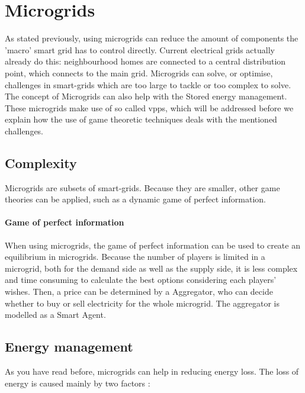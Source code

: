 \newpage
\section{Microgrids}\label{microgrids}



As stated previously, using microgrids can reduce the amount of components the 'macro' smart grid has to control directly. Current electrical grids actually already do this: neighbourhood homes are connected to a central distribution point, which connects to the main grid.
Microgrids can solve, or optimise, challenges in smart-grids which are too large to tackle or too complex to solve\cite{MicrogridModellingPetrosAristidou}. The concept of Microgrids can also help with the Stored energy management.
These microgrids make use of so called \acp{vpp}, which will be addressed before we explain how the use of game theoretic techniques deals with the mentioned challenges.


\subsection{Complexity}
Microgrids are subsets of smart-grids. Because they are smaller, other game theories can be applied, such as a dynamic game of perfect information. 

\paragraph{Game of perfect information}
When using microgrids, the game of perfect information can be used to create an equilibrium in microgrids. Because the number of players is limited in a microgrid, both for the demand side as well as the supply side, it is less complex and time consuming to calculate the best options considering each players' wishes. Then, a price can be determined by a Aggregator, who can decide whether to buy or sell electricity for the whole microgrid. The aggregator is modelled as a Smart Agent\cite{MicrogridModellingPetrosAristidou}.


\subsection{Energy management}
As you have read before, microgrids can help in reducing energy loss. The loss of energy is caused mainly by two factors \cite{EnergyLossURL}: 

